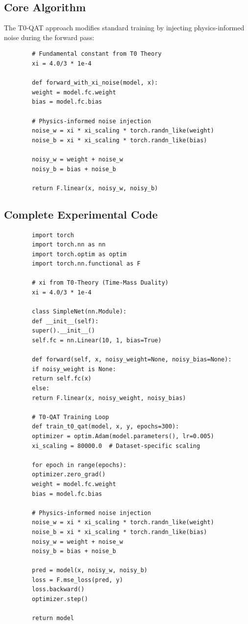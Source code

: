 	\subsection{Core Algorithm}
	
	The T0-QAT approach modifies standard training by injecting physics-informed noise during the forward pass:
	
	\begin{verbatim}
		# Fundamental constant from T0 Theory
		xi = 4.0/3 * 1e-4
		
		def forward_with_xi_noise(model, x):
		weight = model.fc.weight
		bias = model.fc.bias
		
		# Physics-informed noise injection
		noise_w = xi * xi_scaling * torch.randn_like(weight)
		noise_b = xi * xi_scaling * torch.randn_like(bias)
		
		noisy_w = weight + noise_w
		noisy_b = bias + noise_b
		
		return F.linear(x, noisy_w, noisy_b)
	\end{verbatim}
	
	\subsection{Complete Experimental Code}
	
	\begin{verbatim}
		import torch
		import torch.nn as nn
		import torch.optim as optim
		import torch.nn.functional as F
		
		# xi from T0-Theory (Time-Mass Duality)
		xi = 4.0/3 * 1e-4
		
		class SimpleNet(nn.Module):
		def __init__(self):
		super().__init__()
		self.fc = nn.Linear(10, 1, bias=True)
		
		def forward(self, x, noisy_weight=None, noisy_bias=None):
		if noisy_weight is None:
		return self.fc(x)
		else:
		return F.linear(x, noisy_weight, noisy_bias)
		
		# T0-QAT Training Loop
		def train_t0_qat(model, x, y, epochs=300):
		optimizer = optim.Adam(model.parameters(), lr=0.005)
		xi_scaling = 80000.0  # Dataset-specific scaling
		
		for epoch in range(epochs):
		optimizer.zero_grad()
		weight = model.fc.weight
		bias = model.fc.bias
		
		# Physics-informed noise injection
		noise_w = xi * xi_scaling * torch.randn_like(weight)
		noise_b = xi * xi_scaling * torch.randn_like(bias)
		noisy_w = weight + noise_w
		noisy_b = bias + noise_b
		
		pred = model(x, noisy_w, noisy_b)
		loss = F.mse_loss(pred, y)
		loss.backward()
		optimizer.step()
		
		return model
	\end{verbatim}
	
